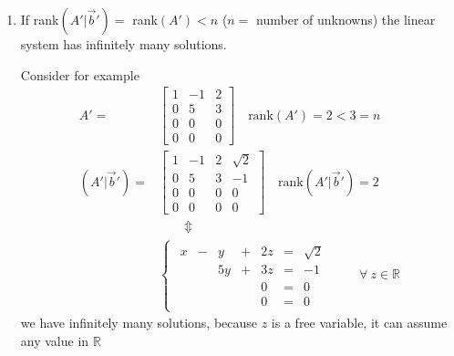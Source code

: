 \begin{enumerate}
\begin{align*}
\begin{array}{ccc|c}
1 & -1 & 2 &-1\\
0 & 5 & 3 & 0\\
0 & 0 & -2 & 3\\
0 & 0 & 0 &0
\end{array}
\right] \qquad \text{rank}\left( A'|\vec b' \right) = 3\\
&\\
&\begin{cases}
\begin{alignedat}{4}
x &{}-{}& y &{}+{}& 2z &{}={}& -1\\
  &      & 5y&{}+{}& 3z &{}={}& 0\\
  &      &   &      &-2z &{}={}& 3\\
  &      &   &      & 0  &{}={}& 0
\end{alignedat}
\end{cases}
\end{align*}
\item If rank$\left(A'|\vec b' \right) =$ rank$(A') < n$ ($n =$ number of unknowns) the linear system has infinitely many solutions.

Consider for example
\begin{align*}
A' = &\begin{bmatrix}
        1 &-1 &2\\
        0 &5 &3\\
        0 &0 &0\\
        0 & 0 &0
    \end{bmatrix} \quad \text{rank}(A') = 2 < 3 = n\\
    \left(A' | \vec b'\right) = &\left[
\begin{array}{ccc|c}
1 & -1 & 2 &\sqrt{2}\\
0 & 5 & 3 & -1\\
0 & 0 & 0 & 0\\
0 & 0 & 0 &0
\end{array}
\right] \quad \text{rank}\left(A' | \vec b'\right) = 2\\
& \qquad \Updownarrow \\
&\begin{cases}
\begin{alignedat}{4}
x &{}-{}& y &{}+{}& 2z &{}={}& \sqrt{2}\\
  &      & 5y&{}+{}& 3z &{}={}& -1\\
  &      &   &      &0 &{}={}& 0\\
  &      &   &      & 0  &{}={}& 0
\end{alignedat}
\end{cases} \qquad \forall \ z \in \mathbb{R}
\end{align*}
we have infinitely many solutions, because $z$ is a free variable, it can assume any value in $\mathbb{R}$
\end{enumerate}
